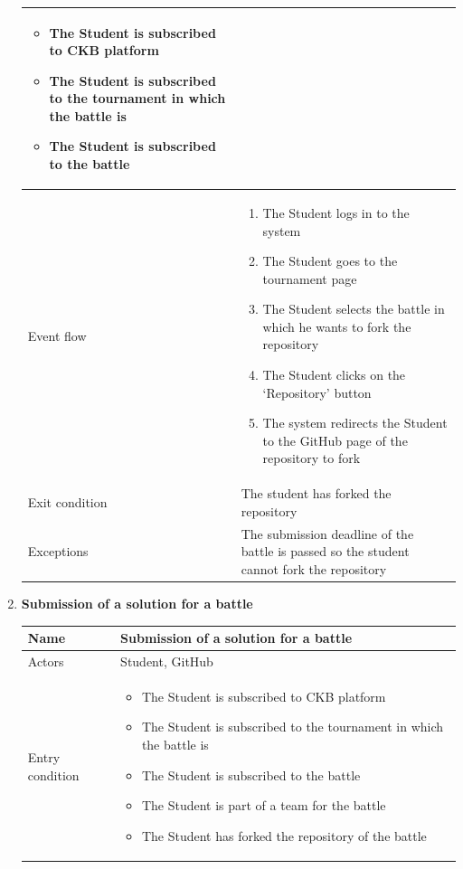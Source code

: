 \begin{enumerate}[label=UC\arabic*:]
\begin{tabular}{|p{3cm}|p{8cm}|}
        \begin{itemize}
            \item The Student is subscribed to CKB platform
            \item The Student is subscribed to the tournament in which the battle is
            \item The Student is subscribed to the battle
        \end{itemize} \\
        \hline
        Event flow &
        \begin{enumerate}[label=\arabic*.]
            \item The Student logs in to the system
            \item The Student goes to the tournament page
            \item The Student selects the battle in which he wants to fork the repository
            \item The Student clicks on the `Repository' button
            \item The system redirects the Student to the GitHub page of the repository to fork
        \end{enumerate} \\
        \hline
        Exit condition & The student has forked the repository \\
        \hline
        Exceptions & The submission deadline of the battle is passed so the student cannot fork the repository \\
        \hline
    \end{tabular}
    \item \textbf{Submission of a solution for a battle} \\
    \begin{tabular}{|p{3cm}|p{8cm}|}
        \hline
        Name & Submission of a solution for a battle \\
        \hline
        Actors & Student, GitHub \\
        \hline
        Entry condition &
        \begin{itemize}
            \item The Student is subscribed to CKB platform
            \item The Student is subscribed to the tournament in which the battle is
            \item The Student is subscribed to the battle
            \item The Student is part of a team for the battle
            \item The Student has forked the repository of the battle

\end{itemize}
\end{tabular}
\end{enumerate}
